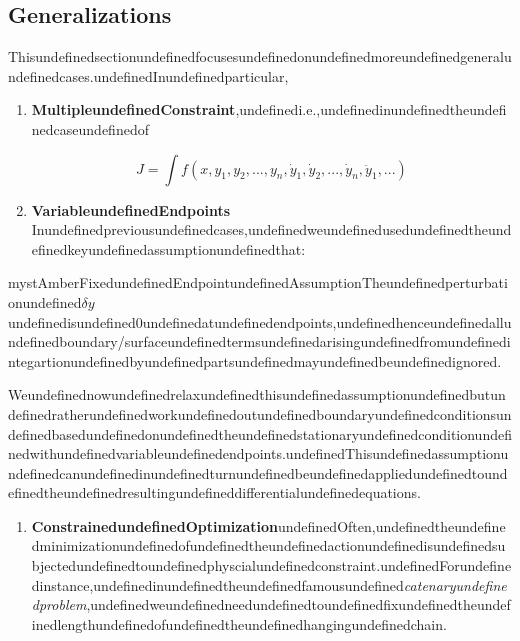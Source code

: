 \subsection{Generalizations}

Thisundefinedsectionundefinedfocusesundefinedonundefinedmoreundefinedgeneralundefinedcases.undefinedInundefinedparticular,

\begin{enumerate}
\item \textbf{MultipleundefinedConstraint},undefinedi.e.,undefinedinundefinedtheundefinedcaseundefinedof

\begin{equation}
J=\int f(x,y_1,y_2,...,y_n,\dot y_1, \dot y_2,...,\dot y_n, \ddot y_1,...)
\end{equation}


\item \textbf{VariableundefinedEndpoints}
Inundefinedpreviousundefinedcases,undefinedweundefinedusedundefinedtheundefinedkeyundefinedassumptionundefinedthat:
\end{enumerate}

\begin{mystadmonition}{mystAmber}{FixedundefinedEndpointundefinedAssumption}Theundefinedperturbationundefined$\delta y$undefinedisundefined0undefinedatundefinedendpoints,undefinedhenceundefinedallundefinedboundary/surfaceundefinedtermsundefinedarisingundefinedfromundefinedintegartionundefinedbyundefinedpartsundefinedmayundefinedbeundefinedignored.

\end{mystadmonition}
Weundefinednowundefinedrelaxundefinedthisundefinedassumptionundefinedbutundefinedratherundefinedworkundefinedoutundefinedboundaryundefinedconditionsundefinedbasedundefinedonundefinedtheundefinedstationaryundefinedconditionundefinedwithundefinedvariableundefinedendpoints.undefinedThisundefinedassumptionundefinedcanundefinedinundefinedturnundefinedbeundefinedappliedundefinedtoundefinedtheundefinedresultingundefineddifferentialundefinedequations.

\begin{enumerate}[resume]
\item \textbf{ConstrainedundefinedOptimization}undefinedOften,undefinedtheundefinedminimizationundefinedofundefinedtheundefinedactionundefinedisundefinedsubjectedundefinedtoundefinedphyscialundefinedconstraint.undefinedForundefinedinstance,undefinedinundefinedtheundefinedfamousundefined\textit{catenaryundefinedproblem},undefinedweundefinedneedundefinedtoundefinedfixundefinedtheundefinedlengthundefinedofundefinedtheundefinedhangingundefinedchain.
\end{enumerate}

